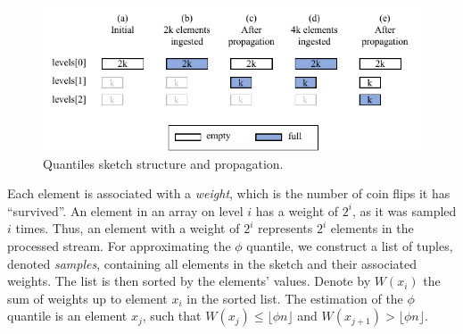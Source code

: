 \begin{figure}[h]
    \centering
    \includegraphics[width=\columnwidth]{graphics/sequential/seq_propagation.pdf}
    \caption{Quantiles sketch structure and propagation.}
    \label{fig: quantiles_sketch}
\end{figure}


Each element is associated with a \emph{weight}, which is the number of coin flips it has ``survived''. An element in an array on level $i$ has a weight of $2^i$, as it was sampled $i$ times. Thus, an element with a weight of $2^i$ represents $2^i$ elements in the processed stream.
For approximating the $\phi$ quantile, we construct a list of tuples, denoted \emph{samples}, containing all elements in the sketch and their associated weights. The list is then sorted by the elements' values. Denote by $W(x_i)$ the sum of weights up to element $x_i$ in the sorted list. The estimation of the $\phi$ quantile is an element $x_j$, such that $W(x_j) \leq \lfloor\phi n\rfloor$ and $W(x_{j+1}) > \lfloor\phi n\rfloor$.